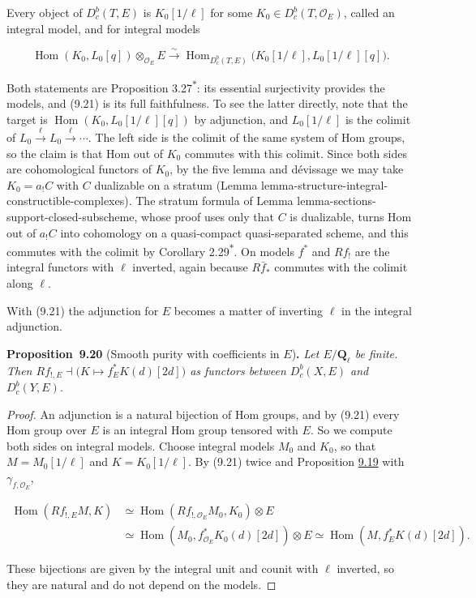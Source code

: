 \documentclass[11pt]{article}
\newenvironment{bpstatement}[2]{\par\addvspace{0.6\baselineskip}\noindent\textbf{#1}#2\textbf{.}\enspace\ignorespaces}
  {\par\addvspace{0.4\baselineskip}}
\newenvironment{bpstatementit}[2]{\begin{bpstatement}{#1}{#2}\itshape\ignorespaces}{\end{bpstatement}}
\newcommand{\bpout}[1]{#1\textsuperscript{\hyperlink{bp-outside}{\ensuremath{\ast}}}}
\providecommand{\Dbc}{}\renewcommand{\Dbc}{D^b_c}
\providecommand{\Hom}{}\renewcommand{\Hom}{\operatorname{Hom}}
\begin{document}
Every object of \(\Dbc(T,E)\) is \(K_0[1/\ell]\) for some \(K_0\in\Dbc(T,\mathcal O_E)\), called an integral model, and for integral models

\[
\Hom(K_0,L_0[q])\otimes_{\mathcal O_E}E
\xrightarrow{\sim}\Hom_{\Dbc(T,E)}\bigl(K_0[1/\ell],L_0[1/\ell][q]\bigr).
\tag{9.21}
\]

Both statements are Proposition \bpout{3.27}: its essential surjectivity provides the models, and (9.21) is its full faithfulness. To see the latter directly, note that the target is \(\Hom(K_0,L_0[1/\ell][q])\) by adjunction, and \(L_0[1/\ell]\) is the colimit of \(L_0\xrightarrow{\ell}L_0\xrightarrow{\ell}\cdots\). The left side is the colimit of the same system of Hom groups, so the claim is that Hom out of \(K_0\) commutes with this colimit. Since both sides are cohomological functors of \(K_0\), by the five lemma and dévissage we may take \(K_0=a_!C\) with \(C\) dualizable on a stratum (Lemma lemma-structure-integral-constructible-complexes). The stratum formula of Lemma lemma-sections-support-closed-subscheme, whose proof uses only that \(C\) is dualizable, turns Hom out of \(a_!C\) into cohomology on a quasi-compact quasi-separated scheme, and this commutes with the colimit by Corollary \bpout{2.29}. On models \(f^*\) and \(Rf_!\) are the integral functors with \(\ell\) inverted, again because \(R\bar f_*\) commutes with the colimit along \(\ell\).

With (9.21) the adjunction for \(E\) becomes a matter of inverting \(\ell\) in the integral adjunction.

\label{bp68}%
\begin{bpstatementit}{Proposition~9.20}{ (Smooth purity with coefficients in $E$)}
Let \(E/\mathbf Q_\ell\) be finite. Then \(Rf_{!,E}\dashv\bigl(K\mapsto f_E^*K(d)[2d]\bigr)\) as functors between \(\Dbc(X,E)\) and \(\Dbc(Y,E)\).
\end{bpstatementit}

\begin{proof}[{Proof}]\label{bp69}%
An adjunction is a natural bijection of Hom groups, and by (9.21) every Hom group over \(E\) is an integral Hom group tensored with \(E\). So we compute both sides on integral models. Choose integral models \(M_0\) and \(K_0\), so that \(M=M_0[1/\ell]\) and \(K=K_0[1/\ell]\). By (9.21) twice and Proposition \hyperref[bp63]{9.19} with \(\gamma_{f,\mathcal O_E}\),

\[
\begin{aligned}
\Hom(Rf_{!,E}M,K)&\simeq\Hom(Rf_{!,\mathcal O_E}M_0,K_0)\otimes E\\
&\simeq\Hom(M_0,f^*_{\mathcal O_E}K_0(d)[2d])\otimes E
\simeq\Hom(M,f_E^*K(d)[2d]).
\end{aligned}
\]

These bijections are given by the integral unit and counit with \(\ell\) inverted, so they are natural and do not depend on the models.
\end{proof}
\end{document}

